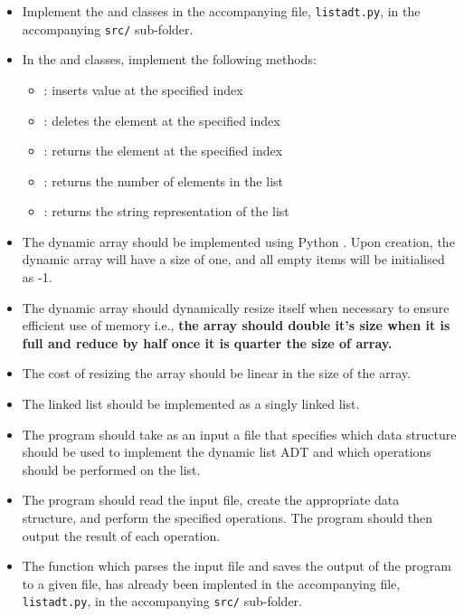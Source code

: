 \documentclass[addpoints]{exam}
\begin{document}
\begin{itemize}
  \item Implement the  and  classes in the accompanying file, \texttt{listadt.py}, in the accompanying \texttt{src/} sub-folder.
  \item In the  and  classes, implement the following methods:
        \begin{itemize}
          \item {}: inserts value at the specified index
          \item {}: deletes the element at the specified index
          \item {}: returns the element at the specified index
          \item {}: returns the number of elements in the list
          \item {}: returns the string representation of the list
        \end{itemize}
  \item The dynamic array should be implemented using Python . Upon creation, the dynamic array will have a size of one, and all empty items will be initialised as -1.
  \item The dynamic array should dynamically resize itself when necessary to ensure efficient use of memory i.e., \textbf{the array should double it's size when it is full
          and reduce by half once it is quarter the size of array.}
  \item The cost of resizing the array should be linear in the size of the array.
  \item The linked list should be implemented as a singly linked list.
  \item The program should take as an input a file that specifies which data structure should be used to implement the dynamic list ADT and which operations should be performed on the list.
  \item The program should read the input file, create the appropriate data structure, and perform the specified operations. The program should then output the result of each operation.
  \item The function  which parses the input file and saves the output of the program to a given file, has already been implented in the accompanying file, \texttt{listadt.py}, in the accompanying \texttt{src/} sub-folder.
\end{itemize}
\end{document}
